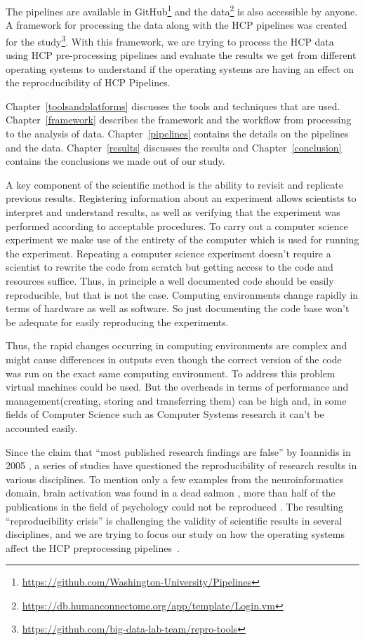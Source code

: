 The pipelines are available in GitHub\footnote{\url{https://github.com/Washington-University/Pipelines}} 
and the data\footnote{\url{https://db.humanconnectome.org/app/template/Login.vm}} 
is also accessible by anyone. A framework for processing the data along with the HCP 
pipelines was created for the study\footnote{\url{https://github.com/big-data-lab-team/repro-tools}}.
With this framework, we are trying to process the HCP data using HCP pre-processing pipelines and evaluate
the results we get from different operating systems to understand if the operating systems are having an effect 
on the reprocducibility of HCP Pipelines.

Chapter~\ref{toolsandplatforms} 
discusses the tools and techniques that are used. 
Chapter~\ref{framework} describes the framework and the workflow from 
processing to the analysis of data. Chapter~\ref{pipelines} contains 
the details on the pipelines and the data. Chapter~\ref{results} 
discusses the results and Chapter~\ref{conclusion} contains the 
conclusions we made out of our study.

\iffalse
A key component of the scientific method is the ability to revisit and replicate previous results. Registering information about an experiment allows scientists to interpret and
understand results, as well as verifying that the experiment was performed according to acceptable procedures. To carry out a computer science experiment we make use of the entirety of the computer which is used for running the experiment. Repeating a computer science experiment doesn't require a scientist to rewrite the code from scratch but getting access to the code and resources suffice. Thus, in principle a well documented code should be easily reproducible, but that is not the case. Computing environments change rapidly in terms of hardware as well as software. So just documenting the code base won't be adequate for easily reproducing the experiments.

Thus, the rapid changes occurring in computing environments are complex and might cause differences in outputs even though the correct version of the code was run on the exact same computing environment. To address this problem virtual machines could be used. But the overheads in terms of performance and management(creating, storing and transferring them) can be high and, in some fields of Computer Science such as Computer Systems research it can't be accounted easily. \cite{7092948}

Since the claim that ``most published research findings are false” by Ioannidis in 2005 \cite{10.1371/journal.pmed.0020124}, a series of studies have questioned the reproducibility of research results in various disciplines. To mention only a few examples from the neuroinformatics domain, brain activation was found in a dead salmon \cite{BENNETT2009S125}, more than half of the publications in the field of psychology could not be reproduced \cite{aac4716}. The resulting “reproducibility crisis” is challenging the validity of scientific results in several disciplines, and we are trying to focus our study on how the operating systems affect the HCP preprocessing pipelines~\cite{Gla13}.


